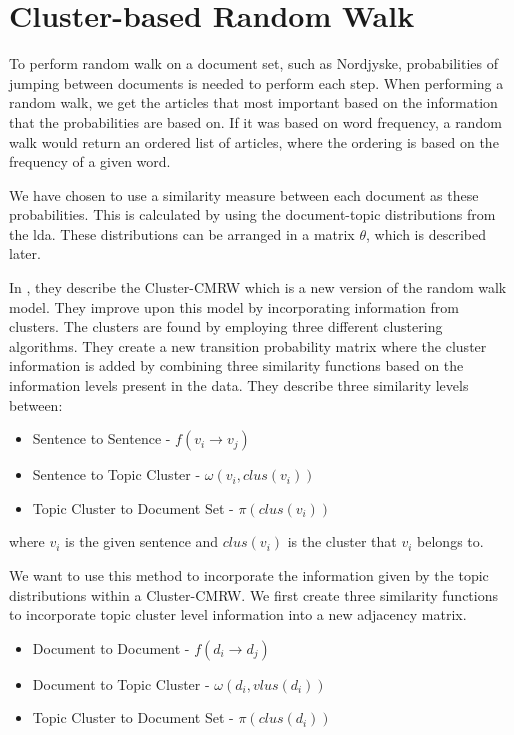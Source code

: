 \section{Cluster-based Random Walk}\label{sec:cluster_pagerank}
To perform random walk on a document set, such as Nordjyske, probabilities of jumping between documents is needed to perform each step. 
When performing a random walk, we get the articles that most important based on the information that the probabilities are based on. 
If it was based on word frequency, a random walk would return an ordered list of articles, where the ordering is based on the frequency of a given word.
 
We have chosen to use a similarity measure between each document as these probabilities.
This is calculated by using the document-topic distributions from the \gls{lda}.
These distributions can be arranged in a matrix $\theta$, which is described later.

In \cite{ClusterPageRank}, they describe the \gls{Cluster-CMRW} which is a new version of the random walk model. 
They improve upon this model by incorporating information from clusters. 
The clusters are found by employing three different clustering algorithms.
They create a new transition probability matrix where the cluster information is added by combining three similarity functions based on the information levels present in the data.
They describe three similarity levels between:
\begin{itemize}
    \item Sentence to Sentence - $f(v_i \rightarrow v_j)$
    \item Sentence to Topic Cluster - $\omega(v_i, clus(v_i))$
    \item Topic Cluster to Document Set - $\pi(clus(v_i))$
\end{itemize}
where $v_i$ is the given sentence and $clus(v_i)$ is the cluster that $v_i$ belongs to.

We want to use this method to incorporate the information given by the topic distributions within a \gls{Cluster-CMRW}. 
We first create three similarity functions to incorporate topic cluster level information into a new adjacency matrix.
\begin{itemize}
    \item Document to Document - $f(d_i \rightarrow d_j)$
    \item Document to Topic Cluster - $\omega(d_i,vlus(d_i))$
    \item Topic Cluster to Document Set - $\pi(clus(d_i))$
\end{itemize}


